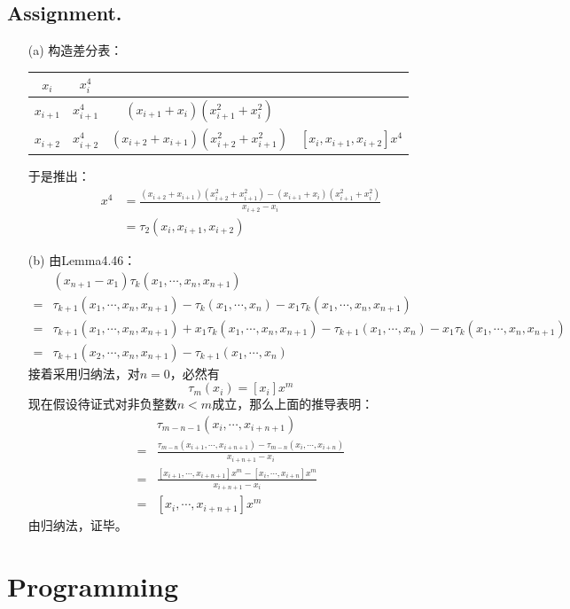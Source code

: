 \documentclass[a4paper,11.5pt,UTF8]{ctexart}
\begin{document}
\begin{large}
\subsection{Assignment.\uppercase\expandafter{}}
\begin{itemize}
	\item[(a)] 构造差分表：
	\begin{center}
		\begin{tabular}{c|c c c}
			$x_i$ & $x_i^4$ & & \\
			\hline
			$x_{i+1}$ & $x_{i+1}^4$ & $(x_{i+1}+x_i)(x_{i+1}^2+x_i^2)$ & \\
			\hline
			$x_{i+2}$ & $x_{i+2}^4$ & $(x_{i+2}+x_{i+1})(x_{i+2}^2+x_{i+1}^2)$ & $[x_i,x_{i+1},x_{i+2}]x^4$ 
		\end{tabular}
	\end{center}
	于是推出：
	\begin{align*}
		[x_i,x_{i+1},x_{i+2}]x^4 &= \frac{(x_{i+2}+x_{i+1})(x_{i+2}^2+x_{i+1}^2)-(x_{i+1}+x_i)(x_{i+1}^2+x_i^2)}{x_{i+2}-x_i} \\
		&=\tau_2(x_i,x_{i+1},x_{i+2})
	\end{align*}
	\item[(b)] 由Lemma4.46：
	\begin{align*}
		&(x_{n+1}-x_1)\tau_k(x_1,\cdots,x_n,x_{n+1}) \\
		=& \tau_{k+1}(x_1,\cdots,x_n,x_{n+1})-\tau_k(x_1,\cdots,x_n)-x_1\tau_k(x_1,\cdots,x_n,x_{n+1}) \\
		=& \tau_{k+1}(x_1,\cdots,x_n,x_{n+1})+x_1\tau_k(x_1,\cdots,x_n,x_{n+1})-\tau_{k+1}(x_1,\cdots,x_n)-x_1\tau_k(x_1,\cdots,x_n,x_{n+1}) \\
		=& \tau_{k+1}(x_2,\cdots,x_n,x_{n+1})-\tau_{k+1}(x_1,\cdots,x_n)
	\end{align*}
	接着采用归纳法，对$n=0$，必然有$$\tau_m(x_i)=[x_i]x^m$$
	现在假设待证式对非负整数$n<m$成立，那么上面的推导表明：
	\begin{align*}
		& \tau_{m-n-1}(x_i,\cdots,x_{i+n+1}) \\
		=& \frac{\tau_{m-n}(x_{i+1},\cdots,x_{i+n+1})-\tau_{m-n}(x_i,\cdots,x_{i+n})}{x_{i+n+1}-x_i} \\
		=& \frac{[x_{i+1},\cdots,x_{i+n+1}]x^m-[x_i,\cdots,x_{i+n}]x^m}{x_{i+n+1}-x_{i}} \\
		=& [x_i,\cdots,x_{i+n+1}]x^m
	\end{align*}
	由归纳法，证毕。
\end{itemize}

\section{Programming}

\end{large}
\end{document}
